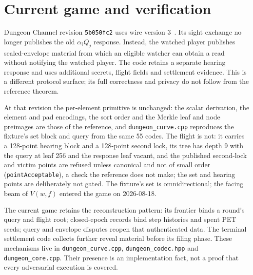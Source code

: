 \documentclass[11pt]{article}
\begin{document}
\section{Current game and verification}
\label{sec:verification}

Dungeon Channel revision \texttt{5b050fc2} uses wire version 3~\cite{dchrepo}.
Its sight exchange no longer publishes the old $\alpha_i Q_j$ response.
Instead, the watched player publishes sealed-envelope material from which an
eligible watcher can obtain a read without notifying the watched player.
The code retains a separate hearing response and uses additional secrets,
flight fields and settlement evidence. This is a different protocol surface;
its full correctness and privacy do not follow from the reference theorem.

At that revision the per-element primitive is unchanged: the scalar
derivation, the element and pad encodings, the sort order and the Merkle leaf
and node preimages are those of the reference, and
\texttt{dungeon\_curve.cpp} reproduces the fixture's set block and query from
the same 55 codes. The flight is not: it carries a 128-point hearing block and
a 128-point second lock, its tree has depth 9 with the query at leaf 256 and
the response leaf vacant, and the published second-lock and victim points are
refused unless canonical and not of small order (\texttt{pointAcceptable}), a
check the reference does not make; the set and hearing points are deliberately
not gated. The
fixture's set is omnidirectional; the facing beam of $V(w,f)$ entered the
game on 2026-08-18.

The current game retains the reconstruction pattern: its frontier binds a
round's query and flight root; closed-epoch records bind step histories and
spent PET seeds; query and envelope disputes reopen that authenticated data.
The terminal settlement code collects further reveal material before its
filing phase. These mechanisms live in \texttt{dungeon\_curve.cpp},
\texttt{dungeon\_codec.hpp} and \texttt{dungeon\_core.cpp}. Their presence is
an implementation fact, not a proof that every adversarial execution is
covered.
\end{document}
